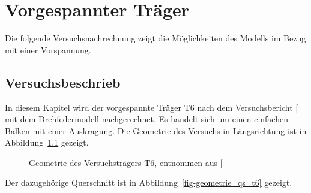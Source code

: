 \documentclass[
  11pt,
  letterpaper,
]{scrreprt}
\begin{document}

\chapter{Vorgespannter Träger}\label{vorgespannter-truxe4ger}

Die folgende Versuchsnachrechnung zeigt die Möglichkeiten des Modells im
Bezug mit einer Vorspannung.

\section{Versuchsbeschrieb}\label{versuchsbeschrieb}

In diesem Kapitel wird der vorgespannte Träger T6 nach dem
Versuchsbericht {[}\citeproc{ref-sigrist_versuche_1993}{5}{]} mit dem
Drehfedermodell nachgerechnet. Es handelt sich um einen einfachen Balken
mit einer Auskragung. Die Geometrie des Versuchs in Längsrichtung ist in
Abbildung~\ref{fig-geometrie_t6} gezeigt.

\begin{figure}[H]


\caption{\label{fig-geometrie_t6}Geometrie des Versuchsträgers T6,
entnommen aus {[}\citeproc{ref-sigrist_versuche_1993}{5}{]}}

\end{figure}%

Der dazugehörige Querschnitt ist in Abbildung~\ref{fig-geometrie_qs_t6}
gezeigt.
\end{document}
